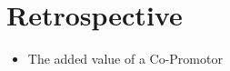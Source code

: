 \chapter{Retrospective}
\label{ch:retrospective}
\lipsum[1]

\begin{itemize}
	\item{The added value of a Co-Promotor}
\end{itemize}
